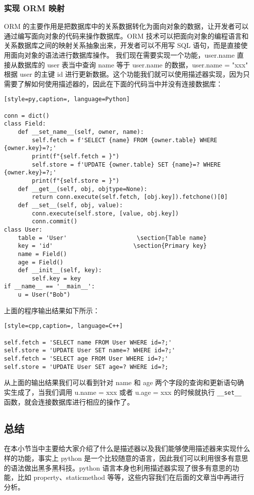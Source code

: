 \subsubsection{实现 ORM 映射}
ORM 的主要作用是把数据库中的关系数据转化为面向对象的数据，让开发者可以通过编写面向对象的代码来操作数据库。ORM 技术可以把面向对象的编程语言和关系数据库之间的映射关系抽象出来，开发者可以不用写 SQL 语句，而是直接使用面向对象的语法进行数据库操作。
我们现在需要实现一个功能，user.name 直接从数据库的 user 表当中查询 name 等于 user.name 的数据，user.name = "xxx" 根据 user 的主键 id 进行更新数据。这个功能我们就可以使用描述器实现，因为只需要了解如何使用描述器的，因此在下面的代码当中并没有连接数据库：
\begin{lstlisting}[style=py,caption=, language=Python]

conn = dict()
class Field:
    def __set_name__(self, owner, name):
        self.fetch = f'SELECT {name} FROM {owner.table} WHERE {owner.key}=?;'
        print(f"{self.fetch = }")
        self.store = f'UPDATE {owner.table} SET {name}=? WHERE {owner.key}=?;'
        print(f"{self.store = }")
    def __get__(self, obj, objtype=None):
        return conn.execute(self.fetch, [obj.key]).fetchone()[0]
    def __set__(self, obj, value):
        conn.execute(self.store, [value, obj.key])
        conn.commit()
class User:
    table = 'User'                    \section{Table name}
    key = 'id'                       \section{Primary key}
    name = Field()
    age = Field()
    def __init__(self, key):
        self.key = key
if __name__ == '__main__':
    u = User("Bob")
\end{lstlisting}
上面的程序输出结果如下所示：
\begin{lstlisting}[style=cpp,caption=, language=C++]

self.fetch = 'SELECT name FROM User WHERE id=?;'
self.store = 'UPDATE User SET name=? WHERE id=?;'
self.fetch = 'SELECT age FROM User WHERE id=?;'
self.store = 'UPDATE User SET age=? WHERE id=?;
\end{lstlisting}
从上面的输出结果我们可以看到针对 name 和 age 两个字段的查询和更新语句确实生成了，当我们调用 u.name = xxx 或者 u.age = xxx 的时候就执行 \verb|__set__| 函数，就会连接数据库进行相应的操作了。
\subsection{总结}
在本小节当中主要给大家介绍了什么是描述器以及我们能够使用描述器来实现什么样的功能，事实上 python 是一个比较随意的语言，因此我们可以利用很多有意思的语法做出黑多黑科技。python 语言本身也利用描述器实现了很多有意思的功能，比如 property、staticmethod 等等，这些内容我们在后面的文章当中再进行分析。


